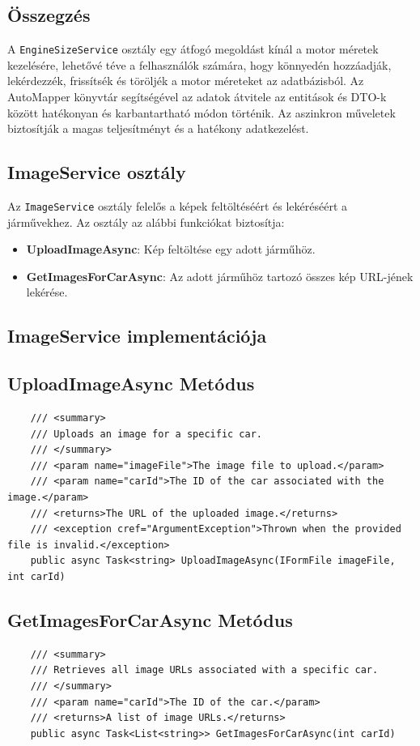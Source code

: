 \documentclass{report}[11pt]
\begin{document}
\subsection*{Összegzés}
A \texttt{EngineSizeService} osztály egy átfogó megoldást kínál a motor méretek kezelésére, lehetővé téve a felhasználók számára, hogy könnyedén hozzáadják, lekérdezzék, frissítsék és töröljék a motor méreteket az adatbázisból. Az AutoMapper könyvtár segítségével az adatok átvitele az entitások és DTO-k között hatékonyan és karbantartható módon történik. Az aszinkron műveletek biztosítják a magas teljesítményt és a hatékony adatkezelést.

\subsection{ImageService osztály}

Az \texttt{ImageService} osztály felelős a képek feltöltéséért és lekéréséért a járművekhez. Az osztály az alábbi funkciókat biztosítja:

\begin{itemize}
    \item \textbf{UploadImageAsync}: Kép feltöltése egy adott járműhöz.
    \item \textbf{GetImagesForCarAsync}: Az adott járműhöz tartozó összes kép URL-jének lekérése.
\end{itemize}

\subsection{ImageService implementációja}

\subsection*{UploadImageAsync Metódus}
\begin{lstlisting}
    /// <summary>
    /// Uploads an image for a specific car.
    /// </summary>
    /// <param name="imageFile">The image file to upload.</param>
    /// <param name="carId">The ID of the car associated with the image.</param>
    /// <returns>The URL of the uploaded image.</returns>
    /// <exception cref="ArgumentException">Thrown when the provided file is invalid.</exception>
    public async Task<string> UploadImageAsync(IFormFile imageFile, int carId)
\end{lstlisting}

\subsection*{GetImagesForCarAsync Metódus}
\begin{lstlisting}
    /// <summary>
    /// Retrieves all image URLs associated with a specific car.
    /// </summary>
    /// <param name="carId">The ID of the car.</param>
    /// <returns>A list of image URLs.</returns>
    public async Task<List<string>> GetImagesForCarAsync(int carId)
\end{lstlisting}
\end{document}
